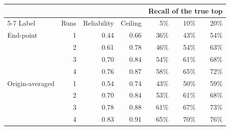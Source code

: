 \begin{tabular}{lrrrrrr}
\toprule
 & & & & \multicolumn{3}{c}{Recall of the true top} \\
\cmidrule(lr){5-7}
Label & Runs & Reliability & Ceiling & 5\% & 10\% & 20\% \\
\midrule
End-point & 1 & 0.44 & 0.66 & 36\% & 43\% & 54\% \\
 & 2 & 0.61 & 0.78 & 46\% & 54\% & 63\% \\
 & 3 & 0.70 & 0.84 & 54\% & 61\% & 68\% \\
 & 4 & 0.76 & 0.87 & 58\% & 65\% & 72\% \\
\addlinespace
Origin-averaged & 1 & 0.54 & 0.74 & 43\% & 50\% & 59\% \\
 & 2 & 0.70 & 0.84 & 53\% & 61\% & 68\% \\
 & 3 & 0.78 & 0.88 & 61\% & 67\% & 73\% \\
 & 4 & 0.83 & 0.91 & 65\% & 70\% & 76\% \\
\bottomrule
\end{tabular}
